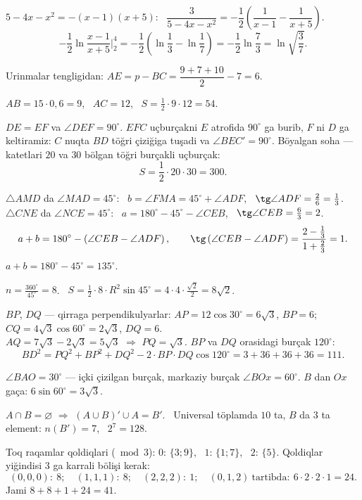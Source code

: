 $5-4x-x^2=-(x-1)(x+5)$: \ $\dfrac3{5-4x-x^2}=-\dfrac12\left(\dfrac1{x-1}-\dfrac1{x+5}\right)$.
\[-\frac12\ln\frac{x-1}{x+5}\Big|_2^4=-\frac12\left(\ln\frac13-\ln\frac17\right)=-\frac12\ln\frac73=\ln\sqrt{\frac37}.\]

Urinmalar tengligidan: $AE=p-BC=\dfrac{9+7+10}2-7=6$.

$AB=15\cdot0{,}6=9$, \ $AC=12$, \ $S=\frac12\cdot9\cdot12=54$.

$DE=EF$ va $\angle DEF=90^\circ$. $EFC$ uçburçakni $E$ atrofida $90^\circ$ ga burib, $F$ ni $D$ ga keltiramiz: $C$ nuqta $BD$ töğri çiziğiga tuşadi va $\angle BEC'=90^\circ$. Böyalgan soha — katetlari $20$ va $30$ bölgan töğri burçakli uçburçak:
\[S=\frac12\cdot20\cdot30=300.\]

$\triangle AMD$ da $\angle MAD=45^\circ$: \ $b=\angle FMA=45^\circ+\angle ADF$, \ $\tg\angle ADF=\frac26=\frac13$.\\
$\triangle CNE$ da $\angle NCE=45^\circ$: \ $a=180^\circ-45^\circ-\angle CEB$, \ $\tg\angle CEB=\frac63=2$.
\[a+b=180^\circ-\left(\angle CEB-\angle ADF\right),\qquad \tg\left(\angle CEB-\angle ADF\right)=\frac{2-\frac13}{1+\frac23}=1.\]
$a+b=180^\circ-45^\circ=135^\circ$.

$n=\frac{360^\circ}{45^\circ}=8$. \ $S=\frac12\cdot8\cdot R^2\sin45^\circ=4\cdot4\cdot\frac{\sqrt2}2=8\sqrt2$.

$BP$, $DQ$ — qirraga perpendikulyarlar: $AP=12\cos30^\circ=6\sqrt3$, $BP=6$; \ $CQ=4\sqrt3\cos60^\circ=2\sqrt3$, $DQ=6$.\\
$AQ=7\sqrt3-2\sqrt3=5\sqrt3$ $\Rightarrow$ $PQ=\sqrt3$. $BP$ va $DQ$ orasidagi burçak $120^\circ$:
\[BD^2=PQ^2+BP^2+DQ^2-2\cdot BP\cdot DQ\cos120^\circ=3+36+36+36=111.\]

$\angle BAO=30^\circ$ — içki çizilgan burçak, markaziy burçak $\angle BOx=60^\circ$. $B$ dan $Ox$ gaça: $6\sin60^\circ=3\sqrt3$.

$A\cap B=\varnothing$ $\Rightarrow$ $(A\cup B)'\cup A=B'$. \ Universal töplamda $10$ ta, $B$ da $3$ ta element: $n(B')=7$, \ $2^7=128$.

Toq raqamlar qoldiqlari ($\bmod3$): $0$: $\{3;9\}$, \ $1$: $\{1;7\}$, \ $2$: $\{5\}$. Qoldiqlar yiğindisi $3$ ga karrali bölişi kerak:
\[(0,0,0):\ 8;\quad(1,1,1):\ 8;\quad(2,2,2):\ 1;\quad(0,1,2)\ \text{tartibda}:\ 6\cdot2\cdot2\cdot1=24.\]
Jami $8+8+1+24=41$.

